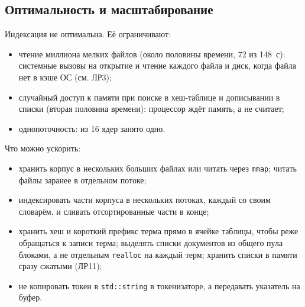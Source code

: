 \subsection{Оптимальность и масштабирование}
Индексация не оптимальна. Её ограничивают:
\begin{itemize}
    \item чтение миллиона мелких файлов (около половины времени, 72 из 148~с): системные вызовы на открытие и чтение каждого файла и диск, когда файла нет в кэше ОС (см. ЛР3);
    \item случайный доступ к памяти при поиске в хеш-таблице и дописывании в списки (вторая половина времени): процессор ждёт память, а не считает;
    \item однопоточность: из 16 ядер занято одно.
\end{itemize}
Что можно ускорить:
\begin{itemize}
    \item хранить корпус в нескольких больших файлах или читать через \texttt{mmap}; читать файлы заранее в отдельном потоке;
    \item индексировать части корпуса в нескольких потоках, каждый со своим словарём, и сливать отсортированные части в конце;
    \item хранить хеш и короткий префикс терма прямо в ячейке таблицы, чтобы реже обращаться к записи терма; выделять списки документов из общего пула блоками, а не отдельным \texttt{realloc} на каждый терм; хранить списки в памяти сразу сжатыми (ЛР11);
    \item не копировать токен в \texttt{std::string} в токенизаторе, а передавать указатель на буфер.
\end{itemize}

